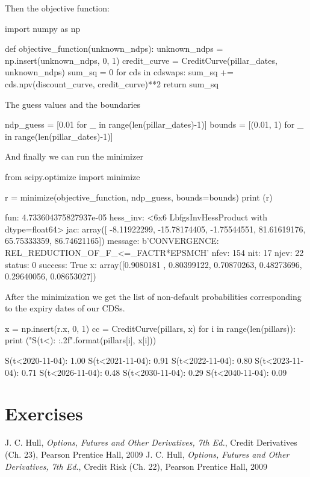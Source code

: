 Then the objective function:
\begin{ipython}
import numpy as np

def objective_function(unknown_ndps):
    unknown_ndps = np.insert(unknown_ndps, 0, 1)
    credit_curve = CreditCurve(pillar_dates, unknown_ndps)
    sum_sq = 0
    for cds in cdswaps:
        sum_sq += cds.npv(discount_curve, credit_curve)**2
    return sum_sq
\end{ipython}

The guess values and the boundaries
\begin{ipython}
ndp_guess = [0.01 for _ in range(len(pillar_dates)-1)]
bounds = [(0.01, 1) for _ in range(len(pillar_dates)-1)]
\end{ipython}

And finally we can run the minimizer
\begin{ipython}
from scipy.optimize import minimize

r = minimize(objective_function, ndp_guess, bounds=bounds)
print (r)
\end{ipython}
\begin{ioutput}
     fun: 4.733604375827937e-05
hess_inv: <6x6 LbfgsInvHessProduct with dtype=float64>
     jac: array([ -8.11922299, -15.78174405,  -1.75544551,  
                  81.61619176,  65.75333359,  86.74621165])
 message: b'CONVERGENCE: REL_REDUCTION_OF_F_<=_FACTR*EPSMCH'
    nfev: 154
     nit: 17
    njev: 22
  status: 0
 success: True
       x: array([0.9080181 , 0.80399122, 0.70870263, 
                 0.48273696, 0.29640056, 0.08653027])
\end{ioutput}

After the minimization we get the list of non-default probabilities corresponding to the expiry dates of our CDSs.

\begin{ipython}
x = np.insert(r.x, 0, 1)
cc = CreditCurve(pillars, x)
for i in range(len(pillars)):
    print ("S(t<{}): {:.2f}".format(pillars[i], x[i]))
\end{ipython}
\begin{ioutput}
S(t<2020-11-04): 1.00
S(t<2021-11-04): 0.91
S(t<2022-11-04): 0.80
S(t<2023-11-04): 0.71
S(t<2026-11-04): 0.48
S(t<2030-11-04): 0.29
S(t<2040-11-04): 0.09
\end{ioutput}

\section{Exercises}


\begin{thebibliography}{9}
 J. C. Hull, \emph{Options, Futures and Other Derivatives, 7th Ed.}, Credit Derivatives (Ch. 23), Pearson Prentice Hall, 2009
 J. C. Hull, \emph{Options, Futures and Other Derivatives, 7th Ed.}, Credit Risk (Ch. 22), Pearson Prentice Hall, 2009
\end{thebibliography}
